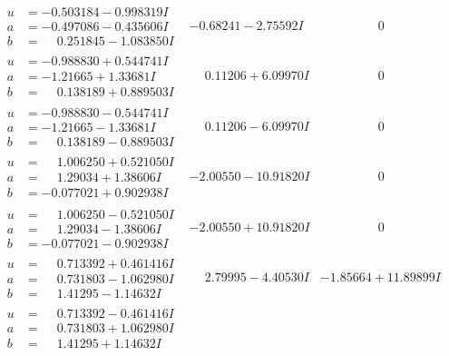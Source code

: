\documentclass[1p]{elsarticle_modified}
\theoremstyle{definition}
\begin{document}
$$\begin{array}{c|c|c}
\begin{aligned}
u &= -0.503184 - 0.998319 I \\
a &= -0.497086 - 0.435606 I \\
b &= \phantom{-}0.251845 - 1.083850 I\end{aligned}
 & -0.68241 - 2.75592 I & \phantom{-0.000000 } 0 \\ \hline\begin{aligned}
u &= -0.988830 + 0.544741 I \\
a &= -1.21665 + 1.33681 I \\
b &= \phantom{-}0.138189 + 0.889503 I\end{aligned}
 & \phantom{-}0.11206 + 6.09970 I & \phantom{-0.000000 } 0 \\ \hline\begin{aligned}
u &= -0.988830 - 0.544741 I \\
a &= -1.21665 - 1.33681 I \\
b &= \phantom{-}0.138189 - 0.889503 I\end{aligned}
 & \phantom{-}0.11206 - 6.09970 I & \phantom{-0.000000 } 0 \\ \hline\begin{aligned}
u &= \phantom{-}1.006250 + 0.521050 I \\
a &= \phantom{-}1.29034 + 1.38606 I \\
b &= -0.077021 + 0.902938 I\end{aligned}
 & -2.00550 - 10.91820 I & \phantom{-0.000000 } 0 \\ \hline\begin{aligned}
u &= \phantom{-}1.006250 - 0.521050 I \\
a &= \phantom{-}1.29034 - 1.38606 I \\
b &= -0.077021 - 0.902938 I\end{aligned}
 & -2.00550 + 10.91820 I & \phantom{-0.000000 } 0 \\ \hline\begin{aligned}
u &= \phantom{-}0.713392 + 0.461416 I \\
a &= \phantom{-}0.731803 - 1.062980 I \\
b &= \phantom{-}1.41295 - 1.14632 I\end{aligned}
 & \phantom{-}2.79995 - 4.40530 I & -1.85664 + 11.89899 I \\ \hline\begin{aligned}
u &= \phantom{-}0.713392 - 0.461416 I \\
a &= \phantom{-}0.731803 + 1.062980 I \\
b &= \phantom{-}1.41295 + 1.14632 I\end{aligned}

\end{array}$$
\end{document}
